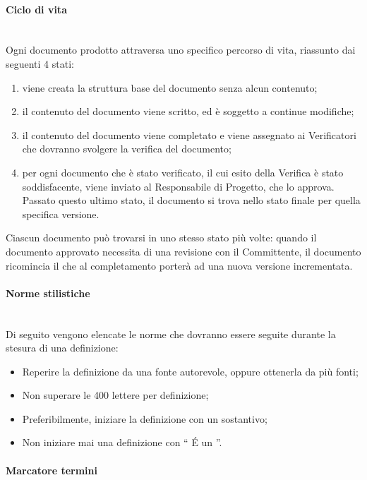 \paragraph{Ciclo di vita} \hfill \\
Ogni documento prodotto attraversa uno specifico percorso di vita, riassunto dai seguenti 4 stati:
\begin{enumerate}
\item {}viene creata la struttura base del documento senza alcun contenuto;
\item {}il contenuto del documento viene scritto, ed è soggetto a continue modifiche;
\item {}il contenuto del documento viene completato e viene assegnato ai Verificatori che dovranno svolgere la verifica del documento;
\item {}per ogni documento che è stato verificato, il cui esito della Verifica è stato soddisfacente, viene inviato al Responsabile di Progetto, che lo approva. Passato questo ultimo stato, il documento si trova nello stato finale per quella specifica versione.
\end{enumerate}

Ciascun documento può trovarsi in uno stesso stato più volte: quando il documento approvato necessita di una revisione con il Committente, il documento ricomincia il  che al completamento porterà ad una nuova versione incrementata.
\newpage


\paragraph{Norme stilistiche} \hfill \\
\label{7.2}
Di seguito vengono elencate le norme che dovranno essere seguite durante la stesura di una definizione:
\begin{itemize}
\item Reperire la definizione da una fonte autorevole, oppure ottenerla da più fonti;
\item Non superare le 400 lettere per definizione;
\item Preferibilmente, iniziare la definizione con un sostantivo;
\item Non iniziare mai una definizione con `` \'E un ''.
\end{itemize}

\paragraph{Marcatore termini} \hfill \\

